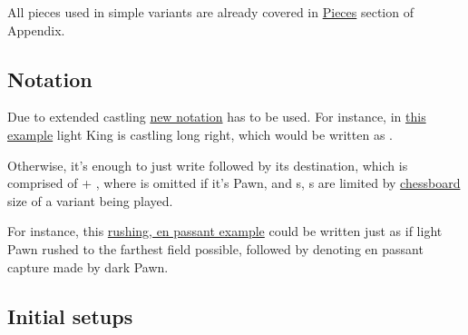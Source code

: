 
All pieces used in simple variants are already covered in
\hyperref[sec:Appendix/Introduction/Pieces]{Pieces} section of Appendix.

\clearpage %

\subsection*{Notation}
\label{sec:Simple variants/Summary/Notation}

Due to extended castling \hyperref[sec:Appendix/Notation]{new notation}
has to be used. For instance, in
\hyperref[fig:classic14_castling_left_00_05]{this example} light King is
castling long right, which would be written as .

Otherwise, it's enough to just write  followed by its destination,
which is comprised of  + , where  is
omitted if it's Pawn, and s, s are limited by
\hyperref[tbl:Simple variants/Summary/Chessboards]{chessboard} size of a variant
being played.

For instance, this
\hyperref[fig:24_classic14_en_passant]{rushing, en passant example} could
be written just as  if light Pawn rushed to the farthest field
possible, followed by  denoting en passant capture made by dark Pawn.

\clearpage %

\subsection*{Initial setups}
\label{sec:Simple variants/Summary/Initial setups}

